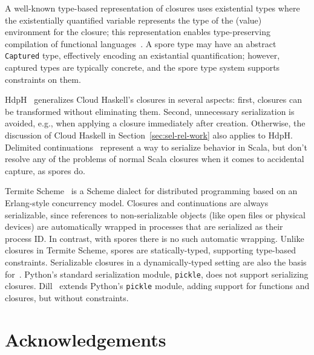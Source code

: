 \documentclass[runningheads]{llncs}
\begin{document}
\begin{sloppypar}
A well-known type-based representation of closures uses existential types
where the existentially quantified variable represents the type of the (value)
environment for the closure; this representation enables type-preserving
compilation of functional languages~\cite{MorrisettWCG99}. A spore type
may have an abstract \verb|Captured| type, effectively encoding an existantial quantification; however,
captured types are typically concrete, and the spore type system supports constraints on them.

HdpH~\cite{HDPH} generalizes Cloud Haskell's closures in several aspects:
first, closures can be transformed without eliminating them. Second,
unnecessary serialization is avoided, e.g., when applying a closure
immediately after creation. Otherwise, the discussion of Cloud Haskell in
Section~\ref{sec:sel-rel-work} also applies to HdpH. Delimited
continuations~\cite{DelimitedContinuations} represent a way to serialize
behavior in Scala, but don't resolve any of the problems of normal Scala
closures when it comes to accidental capture, as spores do.

Termite Scheme~\cite{Termite} is a Scheme dialect for distributed programming
based on an Erlang-style concurrency model. Closures and continuations are
always serializable, since references to non-serializable objects (like open
files or physical devices) are automatically wrapped in processes that are
serialized as their process ID. In contrast, with spores there is no such
automatic wrapping. Unlike closures in Termite Scheme, spores are statically-typed,
supporting type-based constraints. Serializable closures in a
dynamically-typed setting are also the basis for~\cite{DFPS}. Python's
standard serialization module, \verb|pickle|, does not support serializing
closures. Dill~\cite{dill} extends Python's \verb|pickle| module, adding
support for functions and closures, but without constraints.






\section*{Acknowledgements}


\end{sloppypar}
\end{document}
